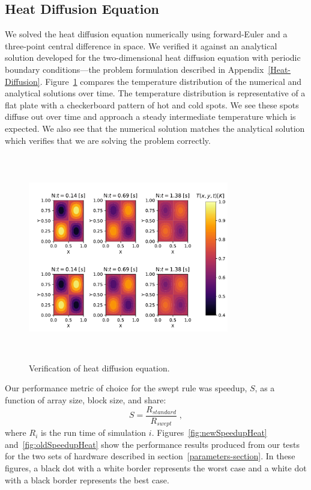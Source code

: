 \documentclass[preprints,article,accept,moreauthors,pdftex]{Definitions/mdpi}
\begin{document}
\subsection{Heat Diffusion Equation}
\label{hdeResults}

We solved the heat diffusion equation numerically using forward-Euler and a three-point central difference in space. We verified it against an analytical solution developed for the two-dimensional heat diffusion equation with periodic boundary conditions---the problem formulation described in Appendix~\ref{Heat-Diffusion}. Figure~\ref{fig:heatSurface} compares the temperature distribution of the numerical and analytical solutions over time. The temperature distribution is representative of a flat plate with a checkerboard pattern of hot and cold spots. We see these spots diffuse out over time and approach a steady intermediate temperature which is expected. We also see that the numerical solution matches the analytical solution which verifies that we are solving the problem correctly.

\begin{figure}[htbp]
    \centering
    \includegraphics[height=9cm,width=0.78\textwidth, trim={0.9cm 0.3cm 0.1cm 0.9cm},clip]{figs/heatValidate.pdf}
    \caption{Verification of heat diffusion equation.}
    \label{fig:heatSurface}
\end{figure}

Our performance metric of choice for the swept rule was speedup, $S$, as a function of array size, block size, and share:
\begin{equation}
    S = \frac{R_{\textit{standard}}}{R_{\textit{swept}}} \;,
\end{equation}
where $R_i$ is the run time of simulation $i$.
Figures~\ref{fig:newSpeedupHeat} and~\ref{fig:oldSpeedupHeat} show the performance results produced from our tests for the two sets of hardware described in section~\ref{parameters-section}. 
In these figures, a black dot with a white border represents the worst case and a white dot with a black border represents the best case.
\end{document}
